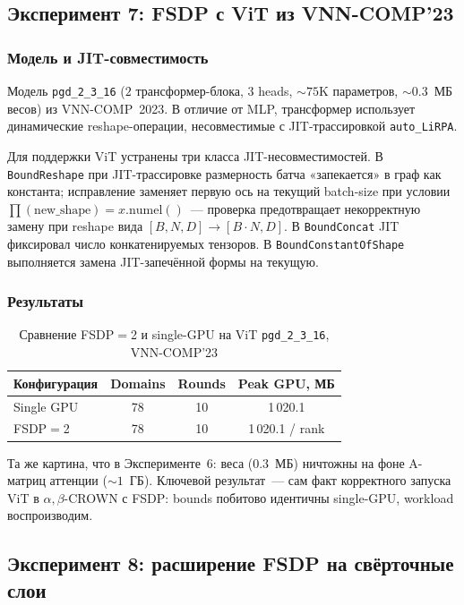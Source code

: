 \subsection{Эксперимент 7: FSDP с ViT из VNN-COMP'23}
\label{sec:exp7}

\subsubsection{Модель и JIT-совместимость}

Модель \texttt{pgd\_2\_3\_16} ($2$ трансформер-блока, $3$ heads,
$\sim\!75$K параметров, $\sim\!0.3$~МБ весов) из VNN-COMP~2023.
В отличие от MLP, трансформер использует динамические
reshape-операции, несовместимые с JIT-трассировкой \texttt{auto\_LiRPA}.

Для поддержки ViT устранены три класса JIT-несовместимостей.
В \texttt{BoundReshape} при JIT-трассировке размерность батча
«запекается» в граф как константа; исправление заменяет первую ось
на текущий batch-size при условии $\prod(\text{new\_shape}) =
x.\text{numel}()$~--- проверка предотвращает некорректную замену
при reshape вида $[B, N, D] \to [B \cdot N, D]$.
В \texttt{BoundConcat} JIT фиксировал число конкатенируемых тензоров.
В \texttt{BoundConstantOfShape} выполняется замена JIT-запечённой
формы на текущую.

\subsubsection{Результаты}

\begin{table}[htbp]
\centering
\caption{Сравнение FSDP$=$2 и single-GPU
на ViT \texttt{pgd\_2\_3\_16}, VNN-COMP'23}
\label{tab:fsdp-vit}
\begin{tabular}{lccc}
\toprule
Конфигурация & Domains & Rounds & Peak GPU, МБ \\
\midrule
Single GPU & 78 & 10 & 1\,020.1 \\
FSDP$=$2   & 78 & 10 & 1\,020.1 / rank \\
\bottomrule
\end{tabular}
\end{table}

Та же картина, что в Эксперименте~6: веса ($0.3$~МБ) ничтожны
на фоне A-матриц аттенции ($\sim\!1$~ГБ).
Ключевой результат~--- сам факт корректного запуска ViT в
$\alpha,\beta$-CROWN с FSDP: bounds побитово идентичны single-GPU,
workload воспроизводим.

\subsection{Эксперимент 8: расширение FSDP на свёрточные слои}
\label{sec:exp8}

